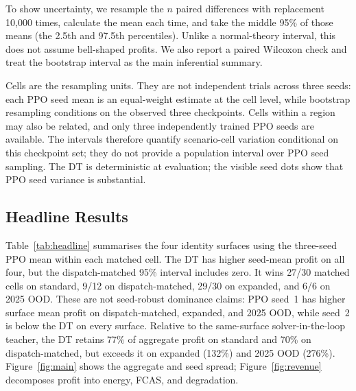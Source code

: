 \documentclass{article}
\begin{document}
To show uncertainty, we resample the $n$ paired differences with replacement
10{,}000 times, calculate the mean each time, and take the middle 95\% of those
means (the 2.5th and 97.5th percentiles). Unlike a normal-theory interval, this
does not assume bell-shaped profits. We also report a paired Wilcoxon check and
treat the bootstrap interval as the main inferential summary.

Cells are the resampling units. They are not independent trials across three
seeds: each PPO seed mean is an equal-weight estimate at the cell level, while
bootstrap resampling conditions on the observed three checkpoints. Cells within
a region may also be related, and only three independently trained PPO seeds are
available. The intervals therefore quantify scenario-cell variation conditional
on this checkpoint set; they do not provide a population interval over PPO seed
sampling. The DT is deterministic at evaluation; the visible seed dots show that
PPO seed variance is substantial.

\subsection{Headline Results}

Table~\ref{tab:headline} summarises the four identity surfaces using the
three-seed PPO mean within each matched cell. The DT has higher seed-mean profit
on all four, but the dispatch-matched 95\% interval includes zero. It wins 27/30
matched cells on standard, 9/12 on dispatch-matched, 29/30 on expanded, and 6/6
on 2025 OOD. These are not seed-robust dominance claims: PPO seed~1 has higher
surface mean profit on dispatch-matched, expanded, and 2025 OOD, while seed~2 is
below the DT on every surface. Relative to the same-surface solver-in-the-loop
teacher, the DT retains 77\% of aggregate profit on standard and 70\% on
dispatch-matched, but exceeds it on expanded (132\%) and 2025 OOD (276\%).
Figure~\ref{fig:main} shows the aggregate and seed spread;
Figure~\ref{fig:revenue} decomposes profit into energy, FCAS, and degradation.
\end{document}
